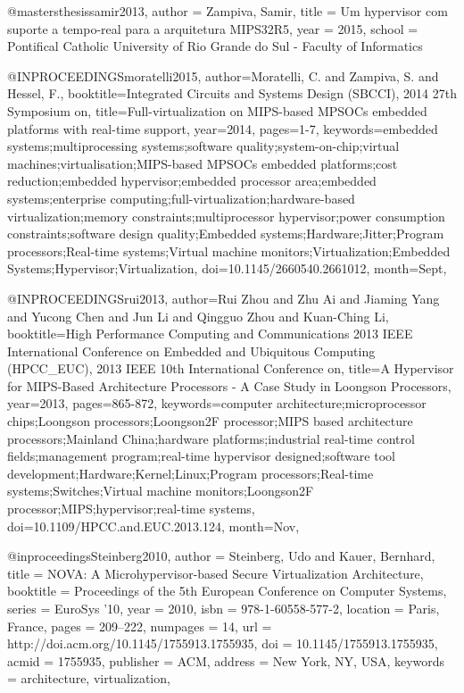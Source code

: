 @mastersthesis{samir2013, 
	author = {Zampiva, Samir},
	title = {Um hypervisor com suporte a tempo-real para a arquitetura {MIPS32R5}},
	year = {2015},
	school = {Pontifical Catholic University of Rio Grande do Sul - Faculty of Informatics}
}

@INPROCEEDINGS{moratelli2015, 
author={Moratelli, C. and Zampiva, S. and Hessel, F.}, 
booktitle={Integrated Circuits and Systems Design (SBCCI), 2014 27th Symposium on}, 
title={Full-virtualization on MIPS-based MPSOCs embedded platforms with real-time support}, 
year={2014}, 
pages={1-7}, 
keywords={embedded systems;multiprocessing systems;software quality;system-on-chip;virtual machines;virtualisation;MIPS-based MPSOCs embedded platforms;cost reduction;embedded hypervisor;embedded processor area;embedded systems;enterprise computing;full-virtualization;hardware-based virtualization;memory constraints;multiprocessor hypervisor;power consumption constraints;software design quality;Embedded systems;Hardware;Jitter;Program processors;Real-time systems;Virtual machine monitors;Virtualization;Embedded Systems;Hypervisor;Virtualization}, 
doi={10.1145/2660540.2661012}, 
month={Sept},}

@INPROCEEDINGS{rui2013, 
author={Rui Zhou and Zhu Ai and Jiaming Yang and Yucong Chen and Jun Li and Qingguo Zhou and Kuan-Ching Li}, 
booktitle={High Performance Computing and Communications 2013 IEEE International Conference on Embedded and Ubiquitous Computing (HPCC\_EUC), 2013 IEEE 10th International Conference on}, 
title={A Hypervisor for MIPS-Based Architecture Processors - A Case Study in Loongson Processors}, 
year={2013}, 
pages={865-872}, 
keywords={computer architecture;microprocessor chips;Loongson processors;Loongson2F processor;MIPS based architecture processors;Mainland China;hardware platforms;industrial real-time control fields;management program;real-time hypervisor designed;software tool development;Hardware;Kernel;Linux;Program processors;Real-time systems;Switches;Virtual machine monitors;Loongson2F processor;MIPS;hypervisor;real-time systems}, 
doi={10.1109/HPCC.and.EUC.2013.124}, 
month={Nov},}

@inproceedings{Steinberg2010,
 author = {Steinberg, Udo and Kauer, Bernhard},
 title = {NOVA: A Microhypervisor-based Secure Virtualization Architecture},
 booktitle = {Proceedings of the 5th European Conference on Computer Systems},
 series = {EuroSys '10},
 year = {2010},
 isbn = {978-1-60558-577-2},
 location = {Paris, France},
 pages = {209--222},
 numpages = {14},
 url = {http://doi.acm.org/10.1145/1755913.1755935},
 doi = {10.1145/1755913.1755935},
 acmid = {1755935},
 publisher = {ACM},
 address = {New York, NY, USA},
 keywords = {architecture, virtualization},
}

